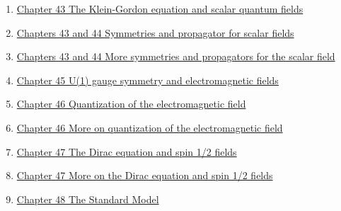 \documentclass[11pt]{article}
\begin{document}
\begin{enumerate}
	\item 	\href{https://mp.weixin.qq.com/s/Pdp791xmKo5iKdeEBNNPJw}{Chapter 43 The Klein-Gordon equation and scalar quantum fields}	%
	\item 	\href{https://mp.weixin.qq.com/s/DaT4MWtwdcIpzvvWLUPxDQ}{Chapters 43 and 44 Symmetries and propagator for scalar fields}	%
	\item 	\href{https://mp.weixin.qq.com/s/RCbs6Bq4Yk1Se0EW00atEQ}{Chapters 43 and 44 More symmetries and propagators for the scalar field}	%
	\item 	\href{https://mp.weixin.qq.com/s/d0MGZEcYyy5dseyYBuUi0Q}{Chapter 45 U(1) gauge symmetry and electromagnetic fields}	%
	\item	\href{https://mp.weixin.qq.com/s/Xm7DksW9jT6n7AK9D7FkYg}{Chapter 46 Quantization of the electromagnetic field}	%
	\item	\href{https://mp.weixin.qq.com/s/wV8Bw7bHCRNGG38jb9n5BQ}{Chapter 46 More on quantization of the electromagnetic field}	%
	\item	\href{https://mp.weixin.qq.com/s/ePFlhqmLI7qIAMbmeSRlKg}{Chapter 47 The Dirac equation and spin 1/2 fields} 	%
	\item 	\href{https://mp.weixin.qq.com/s/jDZIilBMm5RMIjpMi5VhFw}{Chapter 47 More on the Dirac equation and spin 1/2 fields}	%
	\item 	\href{https://mp.weixin.qq.com/s/DYNEzgjJr8uKfzH5Nlgxjw}{Chapter 48 The Standard Model}	%
\end{enumerate}
\end{document}
